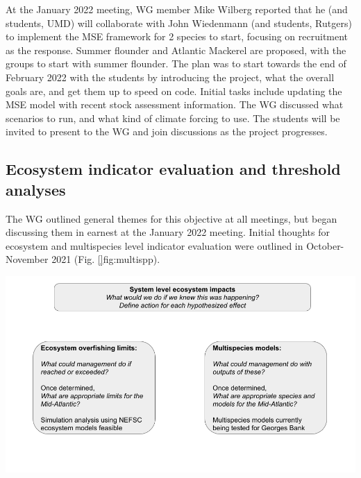 \documentclass[
  10pt,
]{article}
\let\origfigure\figure
\let\endorigfigure\endfigure
\renewenvironment{figure}[1][2] {
    \expandafter\origfigure\expandafter[H]
} {
    \endorigfigure
}
\begin{document}
At the January 2022 meeting, WG member Mike Wilberg reported that he
(and students, UMD) will collaborate with John Wiedenmann (and students,
Rutgers) to implement the MSE framework for 2 species to start, focusing
on recruitment as the response. Summer flounder and Atlantic Mackerel
are proposed, with the groups to start with summer flounder. The plan
was to start towards the end of February 2022 with the students by
introducing the project, what the overall goals are, and get them up to
speed on code. Initial tasks include updating the MSE model with recent
stock assessment information. The WG discussed what scenarios to run,
and what kind of climate forcing to use. The students will be invited to
present to the WG and join discussions as the project progresses.

\hypertarget{ecosystem-indicator-evaluation-and-threshold-analyses}{%
\subsection{Ecosystem indicator evaluation and threshold
analyses}\label{ecosystem-indicator-evaluation-and-threshold-analyses}}

The WG outlined general themes for this objective at all meetings, but
began discussing them in earnest at the January 2022 meeting. Initial
thoughts for ecosystem and multispecies level indicator evaluation were
outlined in October-November 2021 (Fig. \ref{}fig:multispp).

\begin{figure}

{\centering \includegraphics[width=1\linewidth]{images/multisppecosystem} 

}

\caption{SSC outline incorporating ecosystem information into multispecies and ecosystem decisions.}\label{fig:multispp}
\end{figure}
\end{document}
